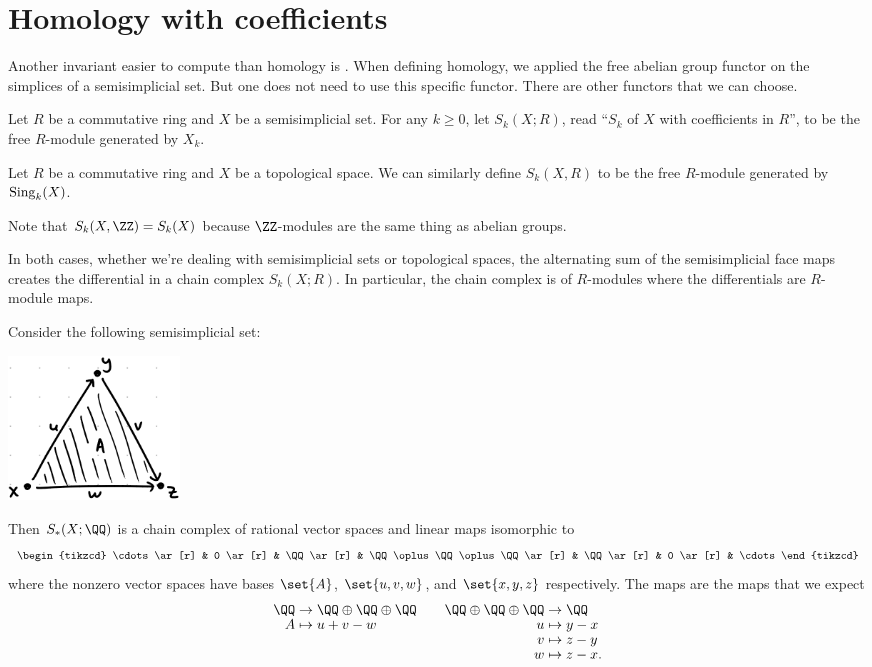 \documentclass{standalone}
\begin{document}
\section{Homology with coefficients}
Another invariant easier to compute than homology is
.
When defining homology, we applied the free abelian group functor
on the simplices of a semisimplicial set.
But one does not need to use this specific functor.
There are other functors that we can choose.
\begin{definition}
  Let \(R\) be a commutative ring and \(X\) be a semisimplicial set.
  For any \(k \geq 0\), let \(S_k(X; R)\),
  read ``\(S_k\) of \(X\) with coefficients in \(R\)'',
  to be the free \(R\)-module generated by \(X_k\).

  Let \(R\) be a commutative ring and \(X\) be a topological space.
  We can similarly define \(S_k(X, R)\) to be the free \(R\)-module
  generated by \(\operatorname{Sing}_k(X)\).
\end{definition}
Note that \(S_k(X, \ZZ) = S_k(X)\) because \(\ZZ\)-modules are
the same thing as abelian groups.

In both cases, whether we're dealing with semisimplicial sets
or topological spaces, the alternating sum of the semisimplicial face maps
creates the differential in a chain complex \(S_k(X; R)\).
In particular, the chain complex is of \(R\)-modules where
the differentials are \(R\)-module maps.

\begin{example}
  Consider the following semisimplicial set:
  \begin{center}
    \includegraphics[width=0.2\textwidth]{18_905-201013-1.png}
  \end{center}
  Then \(S_*(X; \QQ)\) is a chain complex of rational vector spaces
  and linear maps isomorphic to
  \[
    \begin{tikzcd}
      \cdots \ar[r] &
      0 \ar[r] &
      \QQ \ar[r] &
      \QQ \oplus \QQ \oplus \QQ \ar[r] &
      \QQ \ar[r] &
      0 \ar[r] &
      \cdots
    \end{tikzcd}
  \]
  where the nonzero vector spaces have bases \(\set{A}\), \(\set{u, v, w}\),
  and \(\set{x, y, z}\) respectively.
  The maps are the maps that we expect
  \[
    \begin{aligned}[t]
      \QQ & \to \QQ \oplus \QQ \oplus \QQ \\[-1ex]
      A &\mapsto u + v - w
    \end{aligned}
    \qquad
    \begin{aligned}[t]
      \QQ \oplus \QQ \oplus \QQ & \to \QQ \\[-1ex]
      u &\mapsto y - x \\[-1ex]
      v &\mapsto z - y \\[-1ex]
      w &\mapsto z - x.
    \end{aligned}
  \]
\end{example}
\end{document}
